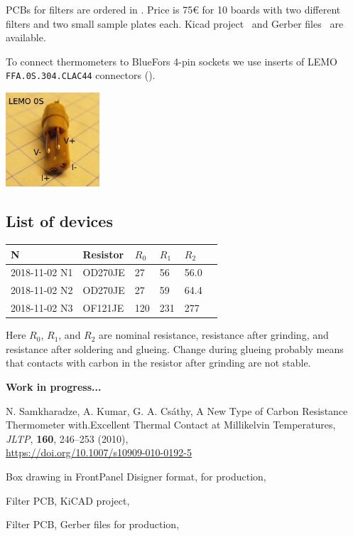 \documentclass[a4paper]{article}
\begin{document}
PCBs for filters are ordered in \MultiCB. Price
is 75\euro{} for 10 boards with two different filters and two small
sample plates each. Kicad project~\cite{filterpcb-kicad} and Gerber
files~\cite{filterpcb-gerber} are available.

To connect thermometers to BlueFors 4-pin sockets we use inserts
of LEMO {\tt FFA.0S.304.CLAC44} connectors ().

\begin{center}
\includegraphics[width=3.5cm]{img/conn.jpg}
\end{center}

\subsection*{List of devices}

\noindent
\begin{tabular}{|ll lll l|}\hline
N& Resistor& $R_0$ & $R_1$ & $R_2$ & \\
\hline
2018-11-02 N1&OD270JE& 27  & 56  & 56.0&\\
2018-11-02 N2&OD270JE& 27  & 59  & 64.4&\\
2018-11-02 N3&OF121JE& 120 & 231 & 277&\\
\hline
\end{tabular}
\medskip

Here $R_0$, $R_1$, and $R_2$ are nominal resistance, resistance after
grinding, and resistance after soldering and glueing. Change during
glueing probably means that contacts with carbon in the resistor
after grinding are not stable.

{\bf Work in progress...}

\begin{thebibliography}{}
N. Samkharadze, A. Kumar, G. A. Cs{\'a}thy,
A New Type of Carbon Resistance Thermometer with.Excellent Thermal Contact at Millikelvin Temperatures,
{\it JLTP}, {\bf 160}, 246--253 (2010),\\
\url{https://doi.org/10.1007/s10909-010-0192-5}

Box drawing in FrontPanel Disigner format, for production,\\

Filter PCB, KiCAD project,\\

Filter PCB, Gerber files for production,\\

\end{thebibliography}
\end{document}
